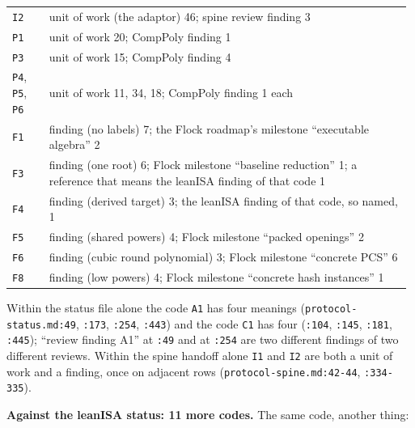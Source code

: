 {\begin{longtable}{@{}>{\raggedright\arraybackslash}p{0.098\linewidth}>{\raggedright\arraybackslash}p{0.885\linewidth}@{}}
\texttt{I2} & unit of work (the adaptor) 46; spine review finding 3 \\\addlinespace[2pt]
\texttt{P1} & unit of work 20; CompPoly finding 1 \\\addlinespace[2pt]
\texttt{P3} & unit of work 15; CompPoly finding 4 \\\addlinespace[2pt]
\texttt{P4}, \texttt{P5}, \texttt{P6} & unit of work 11, 34, 18; CompPoly finding 1 each \\\addlinespace[2pt]
\texttt{F1} & finding (no labels) 7; the Flock roadmap's milestone ``executable algebra'' 2 \\\addlinespace[2pt]
\texttt{F3} & finding (one root) 6; Flock milestone ``baseline reduction'' 1; a reference that means the leanISA finding of that code 1 \\\addlinespace[2pt]
\texttt{F4} & finding (derived target) 3; the leanISA finding of that code, so named, 1 \\\addlinespace[2pt]
\texttt{F5} & finding (shared powers) 4; Flock milestone ``packed openings'' 2 \\\addlinespace[2pt]
\texttt{F6} & finding (cubic round polynomial) 3; Flock milestone ``concrete PCS'' 6 \\\addlinespace[2pt]
\texttt{F8} & finding (low powers) 4; Flock milestone ``concrete hash instances'' 1 \\
\end{longtable}}

\begin{sloppypar}
Within the status file alone the code \texttt{A1} has four meanings (\texttt{protocol-\allowbreak{}status.\allowbreak{}md:\allowbreak{}49}, \texttt{:\allowbreak{}173}, \texttt{:\allowbreak{}254}, \texttt{:\allowbreak{}443}) and the code \texttt{C1} has four (\texttt{:\allowbreak{}104}, \texttt{:\allowbreak{}145}, \texttt{:\allowbreak{}181}, \texttt{:\allowbreak{}445}); ``review finding A1'' at \texttt{:\allowbreak{}49} and at \texttt{:\allowbreak{}254} are two different findings of two different reviews. Within the spine handoff alone \texttt{I1} and \texttt{I2} are both a unit of work and a finding, once on adjacent rows (\texttt{protocol-\allowbreak{}spine.\allowbreak{}md:\allowbreak{}42-\allowbreak{}44}, \texttt{:\allowbreak{}334-\allowbreak{}335}).
\end{sloppypar}

\textbf{Against the leanISA status: 11 more codes.} The same code, another thing:

